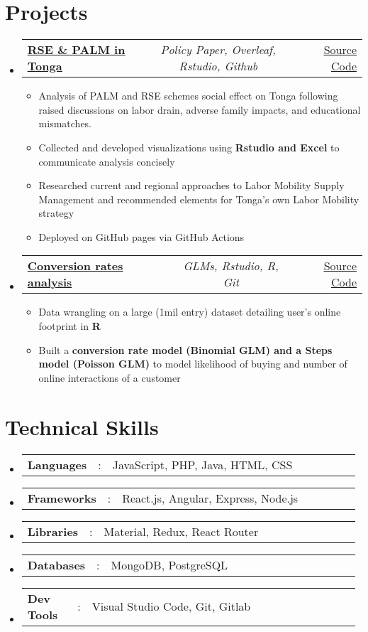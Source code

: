 \documentclass[a4paper,11pt]{article}
\makeatletter
\newcommand{\resumeItem}[1]{
  \item\small{#1}
}
\newcommand{\resumeItemListStart}{\begin{itemize}[rightmargin=0.11in]}
\newcommand{\resumeItemListEnd}{\end{itemize}}
\newcommand{\resumeSectionType}[3]{
  \item\begin{tabular*}{0.96\textwidth}[t]{
    p{0.15\linewidth}p{0.02\linewidth}p{0.81\linewidth}
  }
    \textbf{#1} & #2 & #3
  \end{tabular*}\vspace{-2pt}
}
\newcommand{\resumeTrioHeading}[3]{
  \item\small{
    \begin{tabular*}{0.96\textwidth}[t]{
      l@{\extracolsep{\fill}}c@{\extracolsep{\fill}}r
    }
      \textbf{#1} & \textit{#2} & #3
    \end{tabular*}
  }
}
\newcommand{\resumeHeadingListStart}{
  \begin{itemize}[leftmargin=0.15in, label={}]
}
\newcommand{\resumeHeadingListEnd}{\end{itemize}}
\makeatother
\begin{document}
\section{Projects}
  \resumeHeadingListStart{}
    \resumeTrioHeading{\href{https://github.com/Neyo-M/Labor-Mobility-PALM-RSE-in-Tonga}{\uline{RSE \& PALM in Tonga}}}{Policy Paper, Overleaf, Rstudio, Github}{\href{https://proect1.com/source-code/}{\uline{Source Code}}}
      \resumeItemListStart{}
        \resumeItem{Analysis of PALM and RSE schemes social effect on Tonga following raised discussions on labor drain, adverse family impacts, and educational mismatches.}
        \resumeItem{Collected and developed visualizations using \textbf{Rstudio and Excel} to communicate analysis concisely}
        \resumeItem{Researched current and regional approaches to Labor Mobility Supply Management and recommended elements for Tonga's own Labor Mobility strategy}
        \resumeItem{Deployed on GitHub pages via GitHub Actions}
      \resumeItemListEnd{}

      \resumeTrioHeading{\uline{Conversion rates analysis}}{GLMs, Rstudio, R, Git}{\href{https:project2.com/source-code}{\uline{Source Code}}}
      \resumeItemListStart{}
        \resumeItem{Data wrangling on a large (1mil entry) dataset detailing user's online footprint in \textbf{R}}
        \resumeItem{Built a \textbf{conversion rate model (Binomial GLM) and a Steps model (Poisson GLM)} to model likelihood of buying and number of online interactions of a customer}
      \resumeItemListEnd{}
  \resumeHeadingListEnd{}

\section{Technical Skills}
  \resumeHeadingListStart{}
    \resumeSectionType{Languages}{:}{JavaScript, PHP, Java, HTML, CSS}
    \resumeSectionType{Frameworks}{:}{React.js, Angular, Express, Node.js}
    \resumeSectionType{Libraries}{:}{Material, Redux, React Router}
    \resumeSectionType{Databases}{:}{MongoDB, PostgreSQL}
    \resumeSectionType{Dev Tools}{:}{Visual Studio Code, Git, Gitlab}
  \resumeHeadingListEnd{}



\end{document}
